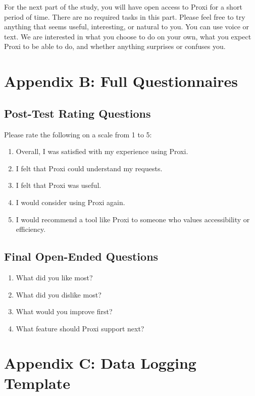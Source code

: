 \documentclass[12pt, titlepage]{article}
\begin{document}
For the next part of the study, you will have open access to Proxi for a
short period of time. There are no required tasks in this part. Please
feel free to try anything that seems useful, interesting, or natural to
you. You can use voice or text. We are interested in what you choose to
do on your own, what you expect Proxi to be able to do, and whether
anything surprises or confuses you.

\section{Appendix B: Full Questionnaires}

\subsection{Post-Test Rating Questions}

Please rate the following on a scale from 1 to 5:
\begin{enumerate}[label=\arabic*.]
    \item Overall, I was satisfied with my experience using Proxi.
    \item I felt that Proxi could understand my requests.
    \item I felt that Proxi was useful.
    \item I would consider using Proxi again.
    \item I would recommend a tool like Proxi to someone who values
    accessibility or efficiency.
\end{enumerate}

\subsection{Final Open-Ended Questions}

\begin{enumerate}[label=\arabic*.]
    \item What did you like most?
    \item What did you dislike most?
    \item What would you improve first?
    \item What feature should Proxi support next?
\end{enumerate}

\section{Appendix C: Data Logging Template}
\end{document}
